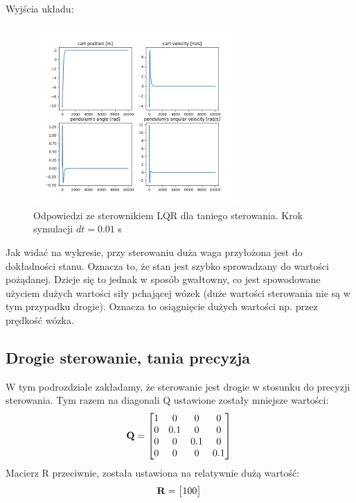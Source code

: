 \documentclass{article}
\begin{document}
Wyjścia układu:
\begin{figure}[H]
    \centering
    \includegraphics[width=0.7\textwidth]{img/drugi.png}
    \caption{Odpowiedzi ze sterownikiem LQR dla taniego sterowania. Krok symulacji $dt=0.01$ s}
    \label{fig:state_space}
\end{figure}

Jak widać na wykresie, przy sterowaniu duża waga przyłożona jest do dokładności stanu. Oznacza to, że stan jest szybko sprowadzany do wartości pożądanej. Dzieje się to jednak w sposób gwałtowny, co jest spowodowane użyciem dużych wartości siły pchającej wózek (duże wartości sterowania nie są w tym przypadku drogie). Oznacza to osiągnięcie dużych wartości np. przez prędkość wózka.

\subsection{Drogie sterowanie, tania precyzja}
W tym podrozdziale zakładamy, że sterowanie jest drogie w stosunku do precyzji sterowania. Tym razem na diagonali Q ustawione zostały mniejsze wartości:
\begin{equation}\label{eq:q1}
\mathbf{Q} = \begin{bmatrix}  1 & 0 & 0 & 0 \\
  							  0 & 0.1 & 0 & 0 \\
  							  0 & 0 & 0.1 & 0 \\
  							  0 & 0 & 0 & 0.1 \\ 
  			   \end{bmatrix} \\ \\
\end{equation}
Macierz R przeciwnie, została ustawiona na relatywnie dużą wartość:
\begin{equation}\label{eq:r1}
\mathbf{R} = \begin{bmatrix}  100
  			   \end{bmatrix} \\ \\
\end{equation}
\end{document}
